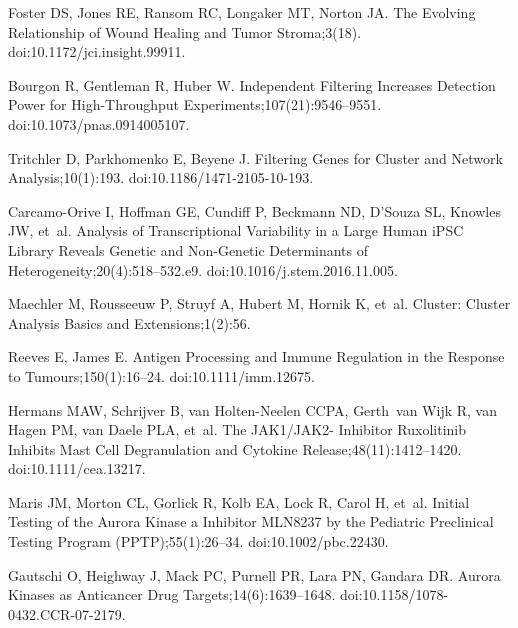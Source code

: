 \documentclass[10pt,letterpaper]{article}
\begin{document}
\begin{thebibliography}{10}
	Foster DS, Jones RE, Ransom RC, Longaker MT, Norton JA.
	\newblock The Evolving Relationship of Wound Healing and Tumor Stroma;3(18).
	\newblock doi:{10.1172/jci.insight.99911}.
	
	Bourgon R, Gentleman R, Huber W.
	\newblock Independent Filtering Increases Detection Power for High-Throughput
	Experiments;107(21):9546--9551.
	\newblock doi:{10.1073/pnas.0914005107}.
	
	Tritchler D, Parkhomenko E, Beyene J.
	\newblock Filtering {{Genes}} for {{Cluster}} and {{Network
			Analysis}};10(1):193.
	\newblock doi:{10.1186/1471-2105-10-193}.
	
	Carcamo-Orive I, Hoffman GE, Cundiff P, Beckmann ND, D’Souza SL, Knowles JW,
	et~al.
	\newblock Analysis of {{Transcriptional Variability}} in a {{Large Human iPSC
			Library Reveals Genetic}} and {{Non}}-Genetic {{Determinants}} of
	{{Heterogeneity}};20(4):518--532.e9.
	\newblock doi:{10.1016/j.stem.2016.11.005}.
	
	Maechler M, Rousseeuw P, Struyf A, Hubert M, Hornik K, et~al.
	\newblock Cluster: Cluster Analysis Basics and Extensions;1(2):56.
	
	Reeves E, James E.
	\newblock Antigen Processing and Immune Regulation in the Response to
	Tumours;150(1):16--24.
	\newblock doi:{10.1111/imm.12675}.
	
	Hermans MAW, Schrijver B, van Holten-Neelen CCPA, Gerth~van Wijk R, van Hagen
	PM, van Daele PLA, et~al.
	\newblock The {{JAK1}}/{{JAK2}}- Inhibitor Ruxolitinib Inhibits Mast Cell
	Degranulation and Cytokine Release;48(11):1412--1420.
	\newblock doi:{10.1111/cea.13217}.
	
	Maris JM, Morton CL, Gorlick R, Kolb EA, Lock R, Carol H, et~al.
	\newblock Initial Testing of the Aurora Kinase a Inhibitor {{MLN8237}} by the
	{{Pediatric Preclinical Testing Program}} ({{PPTP}});55(1):26--34.
	\newblock doi:{10.1002/pbc.22430}.
	
	Gautschi O, Heighway J, Mack PC, Purnell PR, Lara PN, Gandara DR.
	\newblock Aurora {{Kinases}} as {{Anticancer Drug Targets}};14(6):1639--1648.
	\newblock doi:{10.1158/1078-0432.CCR-07-2179}.
	

\end{thebibliography}
\end{document}
